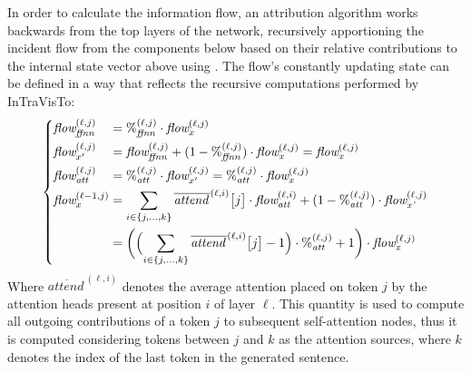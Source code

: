 In order to calculate the information flow, an attribution algorithm works backwards from the top layers of the network, recursively apportioning the incident flow from the components below based on their relative contributions to the internal state vector above using .
The flow's constantly updating state can be defined in a way that reflects the recursive computations performed by InTraVisTo:
\begin{equation}
    \left\{
    \begin{alignedat}{2}
        &\textit{flow}_{\textit{ffnn}}^{(\ell,j)} &&= {\%}_{\textit{ffnn}}^{(\ell,j)} \cdot \textit{flow}_{x}^{(\ell,j)} \\
        &\textit{flow}_{x'}^{(\ell,j)} &&= \textit{flow}_{\textit{ffnn}}^{(\ell,j)} + (1 - {\%}_{\textit{ffnn}}^{(\ell,j)}) \cdot \textit{flow}_{\textit{x}}^{(\ell,j)} = \textit{flow}_{\textit{x}}^{(\ell,j)} \\
        &\textit{flow}_{\textit{att}}^{(\ell,j)} &&= {\%}_{\textit{att}}^{(\ell,j)} \cdot \textit{flow}_{x'}^{(\ell,j)} = {\%}_{\textit{att}}^{(\ell,j)} \cdot \textit{flow}_{x}^{(\ell,j)} \\
        &\textit{flow}_{x}^{(\ell-1,j)} &&= \sum_{i\in\{j,\ldots,k\}}{\overline{\textit{attend}{\,}}^{(\ell,i)}\bigl[j\bigr]}\cdot\textit{flow}_{\textit{att}}^{(\ell,i)} + ( 1 - {\%}_{\textit{att}}^{(\ell,j)})\cdot \textit{flow}_{\textit{x'}}^{(\ell,j)} \\
            &\quad &&= \biggl(\Bigl(\sum_{i\in\{j,\ldots,k\}}\overline{\textit{attend}{\,}}^{(\ell,i)}\bigl[j\bigr] - 1\Bigr)\cdot{\%}_{\textit{att}}^{(\ell,j)} + 1\biggr) \cdot \textit{flow}_{\textit{x}}^{(\ell,j)}
    \end{alignedat}
    \right.
\end{equation}
Where $\overline{\textit{attend}{\,}}^{(\ell,i)}$ denotes the average attention placed on token $j$ by the attention heads present at position $i$ of layer $\ell$.
This quantity is used to compute all outgoing contributions of a token $j$ to subsequent self-attention nodes, thus it is computed considering tokens between $j$ and $k$ as the attention sources, where $k$ denotes the index of the last token in the generated sentence.


